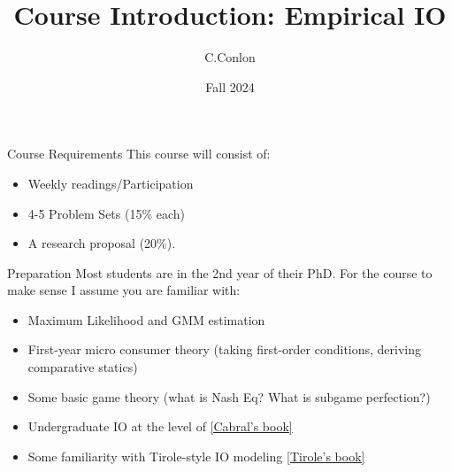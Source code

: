 

\usepackage{tabularx}
\usepackage{dcolumn}
\usepackage{ragged2e}
\usepackage{multirow,multicol,dcolumn}



\title [Course Intro]{Course Introduction: Empirical IO}
\author{C.Conlon}
\date{Fall 2024}


\begin{frame}
\titlepage
\end{frame}

\begin{frame}{Course Requirements}
This course will consist of:
\begin{itemize}
    \item Weekly readings/Participation
    \item 4-5 Problem Sets (15\% each)
    \item A research proposal (20\%).
\end{itemize}
\end{frame}


\begin{frame}{Preparation}
Most students are in the 2nd year of their PhD. For the course to make sense I assume you are familiar with:
\begin{itemize}
    \item Maximum Likelihood and GMM estimation
    \item First-year micro consumer theory (taking first-order conditions, deriving comparative statics)
    \item Some basic game theory (what is Nash Eq? What is subgame perfection?)
    \item Undergraduate IO at the level of \href{https://www.amazon.com/Introduction-Industrial-Organization-MIT-Press/dp/0262035944}{[Cabral's book]}
    \item Some familiarity with Tirole-style IO modeling \href{https://www.amazon.com/Theory-Industrial-Organization-MIT-Press/dp/0262200716/}{[Tirole's book]}
\end{itemize}
\end{frame}



